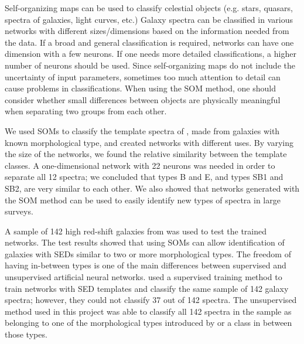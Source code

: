 \documentclass[useAMS,usenatbib]{mn2e}
\begin{document}
Self-organizing maps can be used to classify celestial objects (e.g. stars, quasars, spectra of galaxies, light curves, etc.)
Galaxy spectra can be classified in various networks with different sizes/dimensions based on the information needed from the data. 
If a broad and general classification is required, networks can have one dimension with a few neurons.
If one needs more detailed classifications, a higher number of neurons should be used.
Since self-organizing maps do not include the uncertainty of input parameters, sometimes too much attention to detail can cause problems in classifications. 
When using the SOM method, one should consider whether small differences between objects are physically meaningful when separating two groups from each other.

We used SOMs to classify the template spectra of , made from galaxies with known morphological type, and created networks with different uses.
By varying the size of the networks, we found the relative similarity between the  template classes.
A one-dimensional network with 22 neurons was needed in order to
separate all 12  spectra; we concluded that  types B and E, and types SB1 and SB2, are very similar to each other.
We also showed that networks generated with the SOM method can be used to easily identify new types of spectra in large surveys.

A sample of 142 high red-shift galaxies from  was used to test the trained networks.
The test results showed that using SOMs can allow identification of galaxies with SEDs similar to two or more morphological types.%
The freedom of having in-between types is one of the main differences between supervised and unsupervised artificial neural networks.
 used a supervised training method to train networks with  SED templates and classify the same sample of 142 galaxy spectra;
however, they could not classify 37 out of 142 spectra.
The unsupervised method used in this project was able to classify  all 142 spectra in the sample
as belonging to one of the morphological types introduced by  or a class in between those types.
\end{document}
